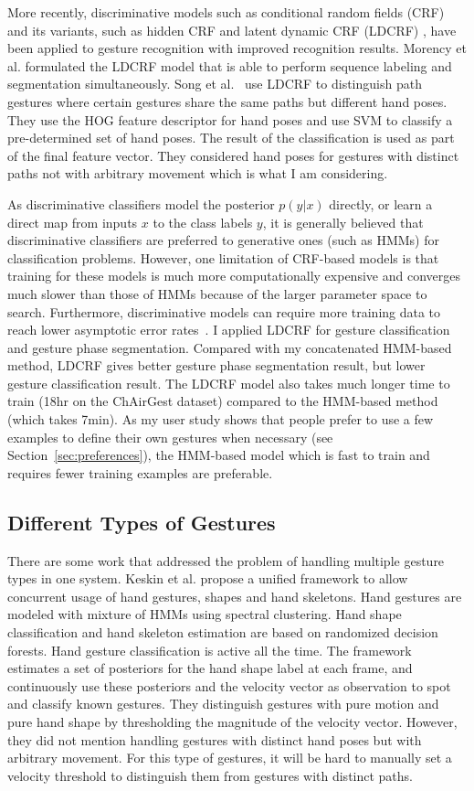 More recently, discriminative models such as
conditional random fields (CRF) and its variants, such as hidden CRF
\cite{wang06} and latent dynamic CRF (LDCRF) \cite{morency07}, have been
applied to gesture recognition with improved recognition results. Morency et al.
\cite{morency07} formulated the LDCRF model that is able to perform sequence labeling and segmentation simultaneously. 
Song et al.~\cite{song12} use LDCRF to distinguish path gestures where
certain gestures share the same paths but different hand poses. They use the HOG
feature descriptor for hand poses and use SVM to classify a pre-determined
set of hand poses. The result of the classification is used as part of the final
feature vector. They considered hand poses for gestures with distinct paths not
with arbitrary movement which is what I am considering.

As discriminative classifiers model the posterior $p(y|x)$ directly, or
learn a direct map from inputs $x$ to the class labels $y$, it is
generally believed that discriminative classifiers are preferred to
generative ones (such as HMMs) for classification problems.
However, one limitation of CRF-based models is that training for these models
is much more computationally expensive and converges much slower than those of
HMMs \cite{lafferty01} because of the larger parameter space to search.
Furthermore, discriminative models can require more training data to reach
lower asymptotic error rates~\cite{ng02}. I applied LDCRF for gesture
classification and gesture phase segmentation.
Compared with my concatenated HMM-based method, LDCRF gives better gesture phase
segmentation result, but lower gesture classification result. The LDCRF model
also takes much longer time to train (18hr on the ChAirGest dataset) compared to
the HMM-based method (which takes 7min). As my user study shows that people
prefer to use a few examples to define their own gestures when necessary (see
Section~\ref{sec:preferences}), the HMM-based model which is fast to train and
requires fewer training examples are preferable.

\subsection{Different Types of Gestures}
There are some work that addressed the problem of handling multiple gesture
types in one system. Keskin et al. \cite{keskin12} propose a unified framework
to allow concurrent usage of hand gestures, shapes and hand skeletons. Hand gestures are modeled with mixture of HMMs using spectral clustering. Hand shape classification and
hand skeleton estimation are based on randomized decision forests. Hand
gesture classification is active all the time. The framework estimates a set of
posteriors for the hand shape label at each frame, and continuously use these
posteriors and the velocity vector as observation to spot and classify known
gestures. They distinguish gestures with pure motion and pure hand shape by
thresholding the magnitude of the velocity vector. However, they did not mention
handling gestures with distinct hand poses but with arbitrary movement. For this
type of gestures, it will be hard to manually set a velocity threshold to
distinguish them from gestures with distinct paths.

